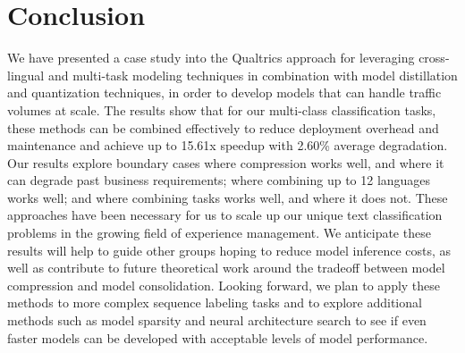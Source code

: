\section{Conclusion}
We have presented a case study into the Qualtrics approach for leveraging cross-lingual and multi-task modeling techniques in combination with model distillation and quantization techniques, in order to develop models that can handle traffic volumes at scale.
The results show that for our multi-class classification tasks, these methods can be combined effectively to reduce deployment overhead and maintenance and achieve up to 15.61x speedup with 2.60\% average degradation.
Our results explore boundary cases where compression works well, and where it can degrade past business requirements; where combining up to 12 languages works well; and where combining tasks works well, and where it does not.
These approaches have been necessary for us to scale up our unique text classification problems in the growing field of experience management.
We anticipate these results will help to guide other groups hoping to reduce model inference costs, as well as contribute to future theoretical work around the tradeoff between model compression and model consolidation.
Looking forward, we plan to apply these methods to more complex sequence labeling tasks and to explore additional methods such as model sparsity and neural architecture search to see if even faster models can be developed with acceptable levels of model performance.